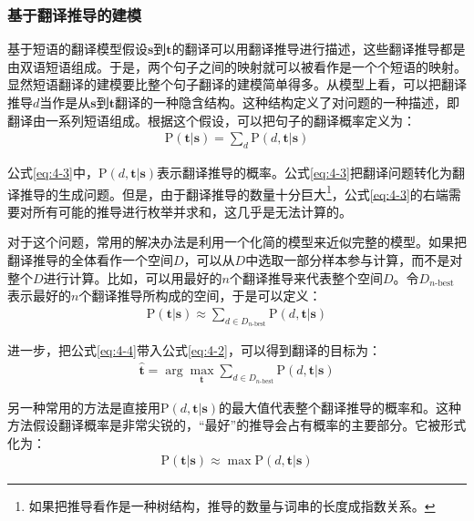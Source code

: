 
\subsubsection{基于翻译推导的建模}

\parinterval 基于短语的翻译模型假设$\mathbf{s}$到$\mathbf{t}$的翻译可以用翻译推导进行描述，这些翻译推导都是由双语短语组成。于是，两个句子之间的映射就可以被看作是一个个短语的映射。显然短语翻译的建模要比整个句子翻译的建模简单得多。从模型上看，可以把翻译推导$d$当作是从$\mathbf{s}$到$\mathbf{t}$翻译的一种隐含结构。这种结构定义了对问题的一种描述，即翻译由一系列短语组成。根据这个假设，可以把句子的翻译概率定义为：
\begin{eqnarray}
\textrm{P}(\mathbf{t}|\mathbf{s}) = \sum_{d} \textrm{P}(d,\mathbf{t}|\mathbf{s})
\label{eq:4-3}
\end{eqnarray}


\parinterval 公式\ref{eq:4-3}中，$\textrm{P}(d,\mathbf{t}|\mathbf{s})$表示翻译推导的概率。公式\ref{eq:4-3}把翻译问题转化为翻译推导的生成问题。但是，由于翻译推导的数量十分巨大\footnote[3]{如果把推导看作是一种树结构，推导的数量与词串的长度成指数关系。}，公式\ref{eq:4-3}的右端需要对所有可能的推导进行枚举并求和，这几乎是无法计算的。

\parinterval 对于这个问题，常用的解决办法是利用一个化简的模型来近似完整的模型。如果把翻译推导的全体看作一个空间$D$，可以从$D$中选取一部分样本参与计算，而不是对整个$D$进行计算。比如，可以用最好的$n$个翻译推导来代表整个空间$D$。令$D_{n\textrm{-best}}$表示最好的$n$个翻译推导所构成的空间，于是可以定义：
\begin{eqnarray}
\textrm{P}(\mathbf{t}|\mathbf{s}) \approx \sum_{d \in D_{n\textrm{-best}}} \textrm{P}(d,\mathbf{t}|\mathbf{s})
\label{eq:4-4}
\end{eqnarray}

\parinterval 进一步，把公式\ref{eq:4-4}带入公式\ref{eq:4-2}，可以得到翻译的目标为：
\begin{eqnarray}
\hat{\mathbf{t}} = \arg\max_{\mathbf{t}} \sum_{d \in D_{n\textrm{-best}}} \textrm{P}(d,\mathbf{t}|\mathbf{s})
\label{eq:4-5}
\end{eqnarray}

\parinterval 另一种常用的方法是直接用$\textrm{P}(d,\mathbf{t}|\mathbf{s})$的最大值代表整个翻译推导的概率和。这种方法假设翻译概率是非常尖锐的，``最好''的推导会占有概率的主要部分。它被形式化为：
\begin{eqnarray}
\textrm{P}(\mathbf{t}|\mathbf{s}) \approx \max \textrm{P}(d,\mathbf{t}|\mathbf{s})
\label{eq:4-6}
\end{eqnarray}

